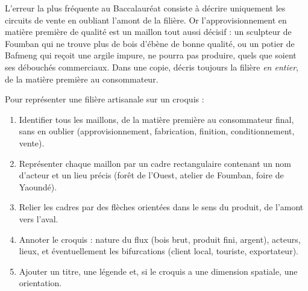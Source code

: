 \documentclass[11pt]{article}
\begin{document}
\begin{attention}
L'erreur la plus fréquente au Baccalauréat consiste à décrire uniquement les circuits de vente en oubliant l'amont de la filière. Or l'approvisionnement en matière première de qualité est un maillon tout aussi décisif : un sculpteur de Foumban qui ne trouve plus de bois d'ébène de bonne qualité, ou un potier de Bafmeng qui reçoit une argile impure, ne pourra pas produire, quels que soient ses débouchés commerciaux. Dans une copie, décris toujours la filière \emph{en entier}, de la matière première au consommateur.
\end{attention}

\begin{methode}
Pour représenter une filière artisanale sur un croquis :
\begin{enumerate}
\item Identifier tous les maillons, de la matière première au consommateur final, sans en oublier (approvisionnement, fabrication, finition, conditionnement, vente).
\item Représenter chaque maillon par un cadre rectangulaire contenant un nom d'acteur et un lieu précis (forêt de l'Ouest, atelier de Foumban, foire de Yaoundé).
\item Relier les cadres par des flèches orientées dans le sens du produit, de l'amont vers l'aval.
\item Annoter le croquis : nature du flux (bois brut, produit fini, argent), acteurs, lieux, et éventuellement les bifurcations (client local, touriste, exportateur).
\item Ajouter un titre, une légende et, si le croquis a une dimension spatiale, une orientation.
\end{enumerate}
\end{methode}
\end{document}
